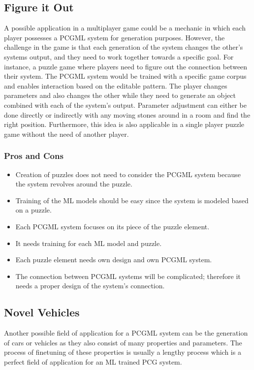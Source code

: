 \documentclass[MGS,Master,english]{twbook}%
\begin{document}
\subsection{Figure it Out} \label{idea::figureItOut}
A possible application in a multiplayer game could be a mechanic in which each player possesses a PCGML system for generation purposes. However, the challenge in the game is that each generation of the system changes the other’s systems output, and they need to work together towards a specific goal. For instance, a puzzle game where players need to figure out the connection between their system. The PCGML system would be trained with a specific game corpus and enables interaction based on the editable pattern. The player changes parameters and also changes the other while they need to generate an object combined with each of the system's output. Parameter adjustment can either be done directly or indirectly with any moving stones around in a room and find the right position. Furthermore, this idea is also applicable in a single player puzzle game without the need of another player.

\subsubsection{Pros and Cons}
\begin{itemize}
	\item Creation of puzzles does not need to consider the PCGML system because the system revolves around the puzzle.
	\item Training of the ML models should be easy since the system is modeled based on a puzzle. 
	\item Each PCGML system focuses on its piece of the puzzle element.
	\item It needs training for each ML model and puzzle.
	\item Each puzzle element needs own design and own PCGML system.
	\item The connection between PCGML systems will be complicated; therefore it needs a proper design of the system’s connection.
\end{itemize}


\subsection{Novel Vehicles} \label{idea::novelCars}
Another possible field of application for a PCGML system can be the generation of cars or vehicles as they also consist of many properties and parameters. The process of finetuning of these properties is usually a lengthy process which is a perfect field of application for an ML trained PCG system.
\end{document}
